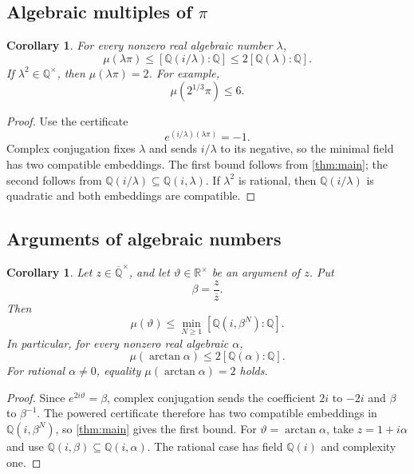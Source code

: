 \documentclass[11pt]{article}
\newcommand{\RR}{\mathbb R}
\newcommand{\QQ}{\mathbb Q}
\newcommand{\Qbar}{\overline{\mathbb Q}}
\newtheorem{corollary}[theorem]{Corollary}
\theoremstyle{definition}
\theoremstyle{remark}
\numberwithin{equation}{section}
\begin{document}
\subsection{\texorpdfstring{Algebraic multiples of $\pi$}{Algebraic multiples of pi}}

\begin{corollary}\label{cor:algebraic-pi}
For every nonzero real algebraic number $\lambda$,
\[
 \boxed{
 \mu(\lambda\pi)
 \le[\QQ(i/\lambda):\QQ]
 \le2[\QQ(\lambda):\QQ].}
\]
If $\lambda^2\in\QQ^\times$, then $\mu(\lambda\pi)=2$.  For
example,
\[
 \mu(2^{1/3}\pi)\le6.
\]
\end{corollary}

\begin{proof}
Use the certificate
\[
 e^{(i/\lambda)(\lambda\pi)}=-1.
\]
Complex conjugation fixes $\lambda$ and sends $i/\lambda$ to its
negative, so the minimal field has two compatible embeddings.  The
first bound follows from \cref{thm:main}; the second follows from
$\QQ(i/\lambda)\subseteq\QQ(i,\lambda)$.  If $\lambda^2$ is rational,
then $\QQ(i/\lambda)$ is quadratic and both embeddings are compatible.
\end{proof}

\subsection{Arguments of algebraic numbers}

\begin{corollary}\label{cor:algebraic-arguments}
Let $z\in\Qbar^\times$, and let $\vartheta\in\RR^\times$ be an argument
of $z$.  Put
\[
 \beta=\frac z{\overline z}.
\]
Then
\[
 \boxed{
 \mu(\vartheta)
 \le
 \min_{N\ge1}
 [\QQ(i,\beta^N):\QQ].}
\]
In particular, for every nonzero real algebraic $\alpha$,
\[
 \boxed{
 \mu(\arctan\alpha)
 \le2[\QQ(\alpha):\QQ].}
\]
For rational $\alpha\ne0$, equality $\mu(\arctan\alpha)=2$ holds.
\end{corollary}

\begin{proof}
Since $e^{2i\vartheta}=\beta$, complex conjugation sends the coefficient
$2i$ to $-2i$ and $\beta$ to $\beta^{-1}$.  The powered certificate
therefore has two compatible embeddings in
$\QQ(i,\beta^N)$, so \cref{thm:main} gives the first bound.  For
$\vartheta=\arctan\alpha$, take
$z=1+i\alpha$ and use
$\QQ(i,\beta)\subseteq\QQ(i,\alpha)$.  The rational case has field
$\QQ(i)$ and complexity one.
\end{proof}
\end{document}
